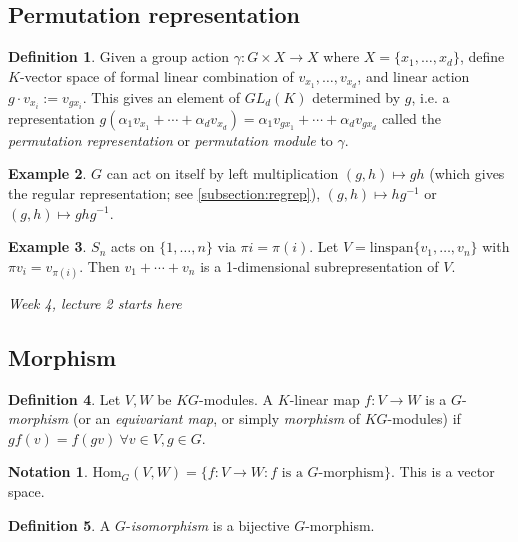 \documentclass{article}
\newcommand{\Hom}{\text{Hom}}
\theoremstyle{definition}
\newtheorem{defn}{Definition}[subsection]
\newtheorem{example}[defn]{Example}
\newtheorem*{notation}{Notation}
\begin{document}
\subsection{Permutation representation}
\begin{defn}
Given a group action $\gamma:G\times X\rightarrow X$ where $X=\{x_1,\ldots,x_d\}$, define $K$-vector space of formal linear combination of $v_{x_1},\ldots,v_{x_d}$, and linear action $g\cdot v_{x_i}:=v_{gx_i}$. This gives an element of $GL_d(K)$ determined by $g$, i.e. a representation $g(\alpha_1 v_{x_1}+\cdots+\alpha_d v_{x_d})=\alpha_1 v_{gx_1}+\cdots+\alpha_d v_{gx_d}$ called the \textit{permutation representation} or \textit{permutation module} to $\gamma$.
\end{defn}

\begin{example}
$G$ can act on itself by left multiplication $(g,h)\mapsto gh$ (which gives the regular representation; see \ref{subsection:regrep}), $(g,h)\mapsto hg^{-1}$ or $(g,h)\mapsto ghg^{-1}$.
\end{example}

\begin{example}
$S_n$ acts on $\{1,\ldots,n\}$ via $\pi i=\pi(i)$. Let $V=\text{linspan}\{v_1,\ldots,v_n\}$ with $\pi v_i=v_{\pi(i)}$. Then $v_1+\cdots+v_n$ is a 1-dimensional subrepresentation of $V$.
\end{example}

\begin{flushright}
\textit{Week 4, lecture 2 starts here}
\end{flushright}

\subsection{Morphism}

\begin{defn}
Let $V,W$ be $KG$-modules. A $K$-linear map $f:V\rightarrow W$ is a $G$-\textit{morphism} (or an \textit{equivariant map}, or simply \textit{morphism} of $KG$-modules) if $gf(v)=f(gv)\ \forall v\in V, g\in G$.
\end{defn}

\begin{notation}
$\Hom_G(V,W)=\{f:V\rightarrow W:f\text{ is a }G\text{-morphism}\}$. This is a vector space.
\end{notation}

\begin{defn}
A $G$-\textit{isomorphism} is a bijective $G$-morphism.
\end{defn}
\end{document}
